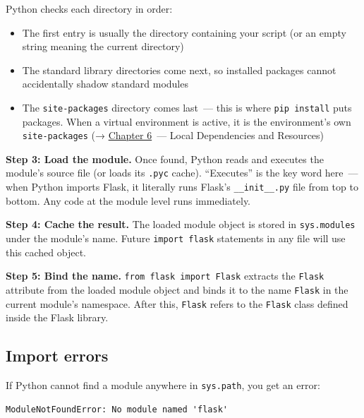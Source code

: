 \noindent{}Python checks each directory in order:

\begin{itemize}
\tightlist
\item
  The first entry is usually the directory containing your script (or an empty string meaning the current directory)
\item
  The standard library directories come next, so installed packages cannot accidentally shadow standard modules
\item
  The \texttt{site-packages} directory comes last~--- this is where \texttt{pip\ install} puts packages. When a virtual environment is active, it is the environment's own \texttt{site-packages} (→ \hyperref[ch:06-local-dependencies]{Chapter 6}~--- Local Dependencies and Resources)
\end{itemize}

\noindent{}\textbf{Step 3: Load the module.} Once found, Python reads and executes the module's source file (or loads its \texttt{.pyc} cache). ``Executes'' is the key word here~--- when Python imports Flask, it literally runs Flask's \texttt{\_\_init\_\_.py} file from top to bottom. Any code at the module level runs immediately.

\textbf{Step 4: Cache the result.} The loaded module object is stored in \texttt{sys.modules} under the module's name. Future \texttt{import\ flask} statements in any file will use this cached object.

\textbf{Step 5: Bind the name.} \texttt{from\ flask\ import\ Flask} extracts the \texttt{Flask} attribute from the loaded module object and binds it to the name \texttt{Flask} in the current module's namespace. After this, \texttt{Flask} refers to the \texttt{Flask} class defined inside the Flask library.

\subsection*{Import errors}\label{02-runtime-initialization:import-errors}

If Python cannot find a module anywhere in \texttt{sys.path}, you get an error:

\begin{outputbox}[short]
\begin{Verbatim}[fontsize=\codesize, breaklines, breakanywhere, breaksymbolleft={\tiny\textcolor{muted}{$\hookrightarrow$}}]
ModuleNotFoundError: No module named 'flask'
\end{Verbatim}
\end{outputbox}

